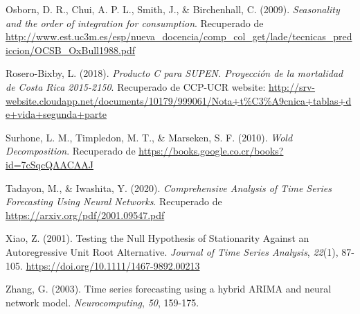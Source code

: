 \documentclass[
]{article}
\newlength{\cslhangindent}
\newenvironment{cslreferences}%
  {\setlength{\parindent}{0pt}%
  \everypar{\setlength{\hangindent}{\cslhangindent}}\ignorespaces}%
  {\par}
\begin{document}
\begin{cslreferences}
\leavevmode\hypertarget{ref-Osborn2009SEASONALITYAT}{}%
Osborn, D. R., Chui, A. P. L., Smith, J., \& Birchenhall, C. (2009).
\emph{Seasonality and the order of integration for consumption}.
Recuperado de
\url{http://www.est.uc3m.es/esp/nueva_docencia/comp_col_get/lade/tecnicas_prediccion/OCSB_OxBull1988.pdf}

\leavevmode\hypertarget{ref-supenprodc}{}%
Rosero-Bixby, L. (2018). \emph{Producto C para SUPEN. Proyección de la
mortalidad de Costa Rica 2015-2150}. Recuperado de CCP-UCR website:
\url{http://srv-website.cloudapp.net/documents/10179/999061/Nota+t\%C3\%A9cnica+tablas+de+vida+segunda+parte}

\leavevmode\hypertarget{ref-Wold}{}%
Surhone, L. M., Timpledon, M. T., \& Marseken, S. F. (2010). \emph{Wold
Decomposition}. Recuperado de
\url{https://books.google.co.cr/books?id=7cSqcQAACAAJ}

\leavevmode\hypertarget{ref-redes}{}%
Tadayon, M., \& Iwashita, Y. (2020). \emph{Comprehensive Analysis of
Time Series Forecasting Using Neural Networks}. Recuperado de
\url{https://arxiv.org/pdf/2001.09547.pdf}

\leavevmode\hypertarget{ref-doi:10.1111ux2f1467-9892.00213}{}%
Xiao, Z. (2001). Testing the Null Hypothesis of Stationarity Against an
Autoregressive Unit Root Alternative. \emph{Journal of Time Series
Analysis}, \emph{22}(1), 87-105.
\url{https://doi.org/10.1111/1467-9892.00213}

\leavevmode\hypertarget{ref-Zhang}{}%
Zhang, G. (2003). Time series forecasting using a hybrid ARIMA and
neural network model. \emph{Neurocomputing}, \emph{50}, 159-175.
\end{cslreferences}
\end{document}
